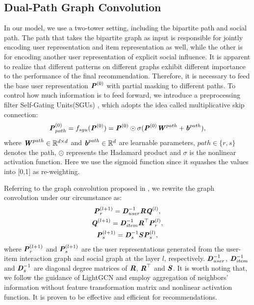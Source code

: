 \documentclass[letterpaper]{article} %
\begin{document}
\subsection{Dual-Path Graph Convolution}
In our model, we use a two-tower setting, including the bipartite path and social path. The path that takes the bipartite graph as input is responsible for jointly encoding user representation and item representation as well, while the other is for encoding another user representation of explicit social influence. It is apparent to realize that different patterns on different graphs exhibit different importance to the performance of the final recommendation. Therefore, it is necessary to feed the base user representation $\textbf{\textit{P}}^{(0)}$ with partial masking to different paths. To control how much information is to feed forward, we introduce a preprocessing filter Self-Gating Units(SGUs) \cite{SGU}, which adopts the idea called multiplicative skip connection:
\begin{align}
    \textbf{\textit{P}}^{(0)}_{path} = f_{sgu}(\textbf{\textit{P}}^{(0)}) = \textbf{\textit{P}}^{(0)} \odot \sigma (\textbf{\textit{P}}^{(0)}\textbf{\textit{W}}^{path} + \textbf{\textit{b}}^{path}),
\end{align}
where $\textbf{\textit{W}}^{path} \in \mathbb{R}^{d\times d}$ and $\textbf{\textit{b}}^{path} \in \mathbb{R}^{d}$ are learnable parameters, $path \in \{r,s\}$ denotes the path, $\odot$ represents the Hadamard product and $\sigma$ is the nonlinear activation function. Here we use the sigmoid function since it squashes the values into [0,1] as re-weighting.

Referring to the graph convolution proposed in \cite{GNN}, we rewrite the graph convolution under our circumstance as:
\begin{gather}
    \textbf{\textit{P}}^{(l+1)}_{r} = \textbf{\textit{D}}^{-1}_{user}\textbf{\textit{R}}\textbf{\textit{Q}}^{(l)},\\
    \textbf{\textit{Q}}^{(l+1)} = \textbf{\textit{D}}^{-1}_{item}\textbf{\textit{R}}^{\top}\textbf{\textit{P}}^{(l)}_{r},\\
    \textbf{\textit{P}}^{(l+1)}_{s} = \textbf{\textit{D}}^{-1}_{s}\textbf{\textit{S}}\textbf{\textit{P}}^{(l)}_{s},
\end{gather}
where $\textbf{\textit{P}}^{(l+1)}_{r}$ and $\textbf{\textit{P}}^{(l+1)}_{s}$ are the user representations generated from the user-item interaction graph and social graph at the layer $l$, respectively. $\textbf{\textit{D}}^{-1}_{user}$, $\textbf{\textit{D}}^{-1}_{item}$ and $\textbf{\textit{D}}^{-1}_{s}$ are diagonal degree matrices of $\textbf{\textit{R}}$, $\textbf{\textit{R}}^{\top}$ and $\textbf{\textit{S}}$. It is worth noting that, we follow the guidance of LightGCN \cite{lightgcn} and employ aggregation of neighbors' information without feature transformation matrix and nonlinear activation function. It is proven to be effective and efficient for recommendations.
\end{document}
